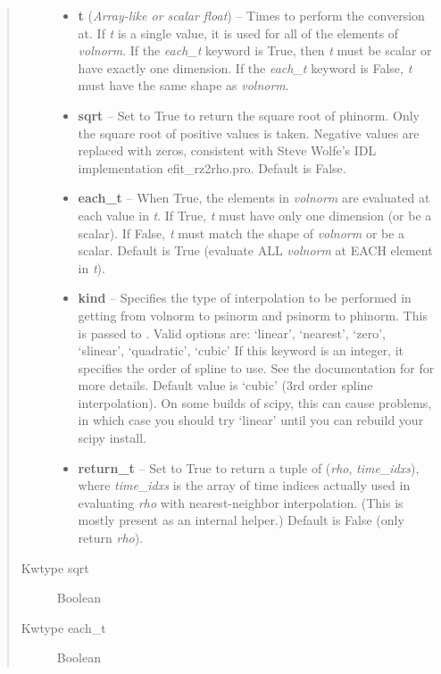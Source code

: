 \documentclass[letterpaper,10pt,english]{sphinxmanual}
\begin{document}
\begin{fulllineitems}
\begin{fulllineitems}
\begin{quote}
\begin{description}
\begin{itemize}
\item {} 
\textbf{t} (\emph{Array-like or scalar float}) -- Times to perform the conversion at.
If \emph{t} is a single value, it is used for all of the elements of
\emph{volnorm}. If the \emph{each\_t} keyword is True, then \emph{t} must be scalar
or have exactly one dimension. If the \emph{each\_t} keyword is False,
\emph{t} must have the same shape as \emph{volnorm}.

\item {} 
\textbf{sqrt} -- Set to True to return the square root of phinorm.
Only the square root of positive values is taken. Negative
values are replaced with zeros, consistent with Steve Wolfe's
IDL implementation efit\_rz2rho.pro. Default is False.

\item {} 
\textbf{each\_t} -- When True, the elements in \emph{volnorm} are evaluated
at each value in \emph{t}. If True, \emph{t} must have only one dimension
(or be a scalar). If False, \emph{t} must match the shape of \emph{volnorm}
or be a scalar. Default is True (evaluate ALL \emph{volnorm} at EACH
element in \emph{t}).

\item {} 
\textbf{kind} -- Specifies the type of
interpolation to be performed in getting from volnorm to
psinorm and psinorm to phinorm. This is passed to
. Valid options are:
`linear', `nearest', `zero', `slinear', `quadratic', `cubic'
If this keyword is an integer, it specifies the order of spline
to use. See the documentation for  for more
details. Default value is `cubic' (3rd order spline
interpolation). On some builds of scipy, this can cause problems,
in which case you should try `linear' until you can rebuild your
scipy install.

\item {} 
\textbf{return\_t} -- Set to True to return a tuple of (\emph{rho},
\emph{time\_idxs}), where \emph{time\_idxs} is the array of time indices
actually used in evaluating \emph{rho} with nearest-neighbor
interpolation. (This is mostly present as an internal helper.)
Default is False (only return \emph{rho}).

\end{itemize}

\item[{Kwtype sqrt}] \leavevmode
Boolean

\item[{Kwtype each\_t}] \leavevmode
Boolean


\end{description}
\end{quote}
\end{fulllineitems}
\end{fulllineitems}
\end{document}
